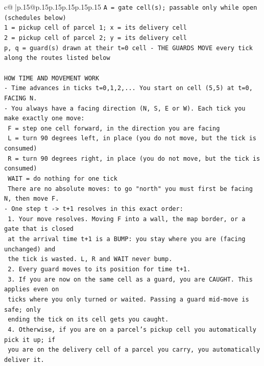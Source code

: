 \documentclass{article}
\begin{document}
{\begin{supertabular}{c@{$\;$}|p{.15\linewidth}@{}p{.15\linewidth}p{.15\linewidth}p{.15\linewidth}p{.15\linewidth}p{.15\linewidth}}
{{{\texttt{A = gate cell(s); passable only while open (schedules below)} \\
\texttt{1 = pickup cell of parcel 1; x = its delivery cell} \\
\texttt{2 = pickup cell of parcel 2; y = its delivery cell} \\
\texttt{p, q = guard(s) drawn at their t=0 cell {-} THE GUARDS MOVE every tick along the routes listed below} \\
\\ 
\texttt{HOW TIME AND MOVEMENT WORK} \\
\texttt{{-} Time advances in ticks t=0,1,2,... You start on cell (5,5) at t=0, FACING N.} \\
\texttt{{-} You always have a facing direction (N, S, E or W). Each tick you make exactly one move:} \\
\texttt{  F    = step one cell forward, in the direction you are facing} \\
\texttt{  L    = turn 90 degrees left, in place (you do not move, but the tick is consumed)} \\
\texttt{  R    = turn 90 degrees right, in place (you do not move, but the tick is consumed)} \\
\texttt{  WAIT = do nothing for one tick} \\
\texttt{  There are no absolute moves: to go "north" you must first be facing N, then move F.} \\
\texttt{{-} One step t {-}> t+1 resolves in this exact order:} \\
\texttt{  1. Your move resolves. Moving F into a wall, the map border, or a gate that is closed} \\
\texttt{     at the arrival time t+1 is a BUMP: you stay where you are (facing unchanged) and} \\
\texttt{     the tick is wasted. L, R and WAIT never bump.} \\
\texttt{  2. Every guard moves to its position for time t+1.} \\
\texttt{  3. If you are now on the same cell as a guard, you are CAUGHT. This applies even on} \\
\texttt{     ticks where you only turned or waited. Passing a guard mid{-}move is safe; only} \\
\texttt{     ending the tick on its cell gets you caught.} \\
\texttt{  4. Otherwise, if you are on a parcel's pickup cell you automatically pick it up; if} \\
\texttt{     you are on the delivery cell of a parcel you carry, you automatically deliver it.} \\
}}}
\end{supertabular}}
\end{document}
